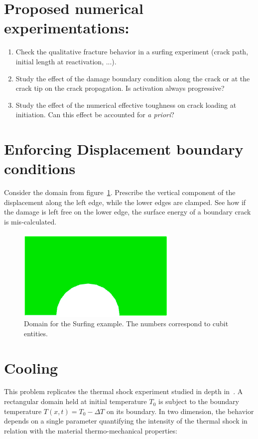 \documentclass[10pt,oneside]{memoir}
\begin{document}
\section*{Proposed numerical experimentations:}
\begin{enumerate}
\item Check the qualitative fracture behavior in a surfing experiment (crack path, initial length at reactivation, ...).
\item Study the effect of the damage boundary condition along the crack or at the crack tip on the crack propagation. Is activation always progressive?
\item Study the effect of the numerical effective toughness on crack loading at initiation. Can this effect be accounted for \emph{a priori}?
\end{enumerate}

\section{Enforcing Displacement boundary conditions}
Consider the domain from figure~\ref{fig:BC}. Prescribe the vertical component of the displacement along the left edge, while the lower edges are clamped. See how if the damage is left free on the lower edge, the surface energy of a boundary crack is mis-calculated.
\begin{figure}[H]
\centering
\includegraphics[width=.45\textwidth]{Examples/BC/Geometry.png}
\caption{Domain for the Surfing example. The numbers correspond to cubit entities.}
\label{fig:BC}
\end{figure}



\section{Cooling}
This problem replicates the thermal shock experiment studied in depth in~\cite{Sicsic-Marigo-2013a,Bourdin-Marigo-EtAl-2014a}. A rectangular domain held at initial temperature $T_0$ is subject to the boundary temperature $T(x,t) = T_0 - \Delta T$ on its boundary. In two dimension, the behavior depends on a single parameter quantifying the intensity of the thermal shock in relation with the material thermo-mechanical properties:
\end{document}
